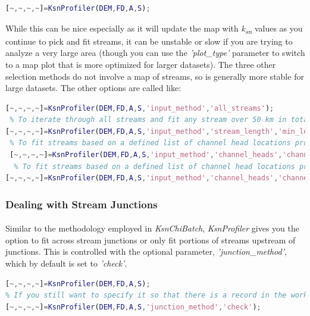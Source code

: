 \begin{lstlisting}[language=Matlab]
[~,~,~,~]=KsnProfiler(DEM,FD,A,S);
\end{lstlisting}

\noindent
 While this can be nice especially as it will update the map with \textit{k\textsubscript{sn}} values as you continue to pick and fit streams, it can be unstable or slow if you are trying to analyze a very large area (though you can use the \textit{'plot\_type'} parameter to switch to a map plot that is more optimized for larger datasets). The three other selection methods do not involve a map of streams, so is generally more stable for large datasets. The other options are called like:
 
 \begin{lstlisting}[language=Matlab]
 % To iterate through all streams in the provided STREAMobj:
[~,~,~,~]=KsnProfiler(DEM,FD,A,S,'input_method','all_streams');
 % To iterate through all streams and fit any stream over 50 km in total length:
[~,~,~,~]=KsnProfiler(DEM,FD,A,S,'input_method','stream_length','min_length_to_extract',50000);
 % To fit streams based on a defined list of channel head locations provided as an array of channel head locations (chl in the example below):
 [~,~,~,~]=KsnProfiler(DEM,FD,A,S,'input_method','channel_heads','channel_head_list',chl);
  % To fit streams based on a defined list of channel head locations provided as an array of channel head locations from a point shapefile of channel heads:
[~,~,~,~]=KsnProfiler(DEM,FD,A,S,'input_method','channel_heads','channel_head_list','channel_heads.shp');
 \end{lstlisting}
 
\subsubsection{Dealing with Stream Junctions}
\paragraph{}Similar to the methodology employed in \textit{KsnChiBatch}, \textit{KsnProfiler} gives you the option to fit across stream junctions or only fit portions of streams upstream of junctions. This is controlled with the optional parameter, \textit{'junction\_method'}, which by default is set to \textit{'check'}. 

 \begin{lstlisting}[language=Matlab]
% To run KsnProfiler in default mode where fits do not occur across stream junctions, no argument is required for 'junction_method':
[~,~,~,~]=KsnProfiler(DEM,FD,A,S);
% If you still want to specify it so that there is a record in the workspace:
[~,~,~,~]=KsnProfiler(DEM,FD,A,S,'junction_method','check');
\end{lstlisting}

